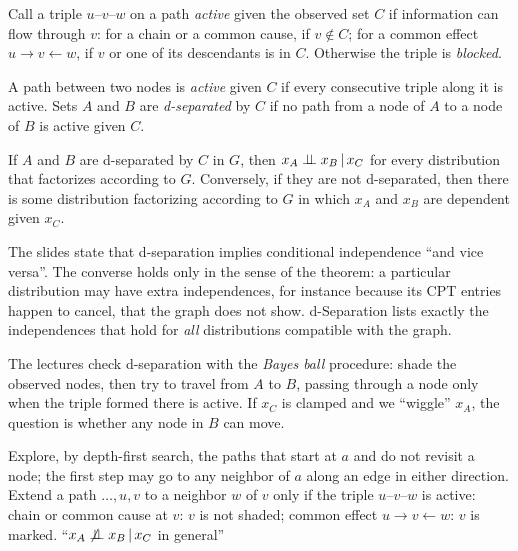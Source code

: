 Call a triple $u\text{--}v\text{--}w$ on a path \emph{active} given the observed set $C$ if information can flow through $v$: for a chain or a common cause, if $v\notin C$; for a common effect $u\to v\leftarrow w$, if $v$ or one of its descendants is in $C$. Otherwise the triple is \emph{blocked}.

\begin{definition}[d-Separation]\label{def:dsep}
A path between two nodes is \emph{active} given $C$ if every consecutive triple along it is active. Sets $A$ and $B$ are \emph{d-separated} by $C$ if no path from a node of $A$ to a node of $B$ is active given $C$.
\end{definition}

\begin{theorem}\label{thm:dsep}
If $A$ and $B$ are d-separated by $C$ in $G$, then $x_A\indep x_B\given x_C$ for every distribution that factorizes according to $G$. Conversely, if they are not d-separated, then there is some distribution factorizing according to $G$ in which $x_A$ and $x_B$ are dependent given $x_C$.
\end{theorem}

\begin{remark}
The slides state that d-separation implies conditional independence ``and vice versa''. The converse holds only in the sense of the theorem: a particular distribution may have extra independences, for instance because its CPT entries happen to cancel, that the graph does not show. d-Separation lists exactly the independences that hold for \emph{all} distributions compatible with the graph.
\end{remark}

The lectures check d-separation with the \emph{Bayes ball} procedure: shade the observed nodes, then try to travel from $A$ to $B$, passing through a node only when the triple formed there is active. If $x_C$ is clamped and we ``wiggle'' $x_A$, the question is whether any node in $B$ can move.

\begin{algorithm}[H]
\caption{Checking $x_A\indep x_B\given x_C$ by d-Separation (Bayes Ball)}\label{alg:dsep}
\begin{algorithmic}[1]
  \State Explore, by depth-first search, the paths that start at $a$ and do not revisit a node; the first step may go to any neighbor of $a$ along an edge in either direction.
  \State Extend a path $\dots,u,v$ to a neighbor $w$ of $v$ only if the triple $u\text{--}v\text{--}w$ is active:
  \Statex \hspace{2.6em} chain or common cause at $v$: $v$ is not shaded;
  \Statex \hspace{2.6em} common effect $u\to v\leftarrow w$: $v$ is marked.
    \State \Return ``$x_A\not\perp\!\!\!\perp x_B\,|\, x_C$ in general''
  \EndIf
\EndFor
{}
\end{algorithmic}
\end{algorithm}

